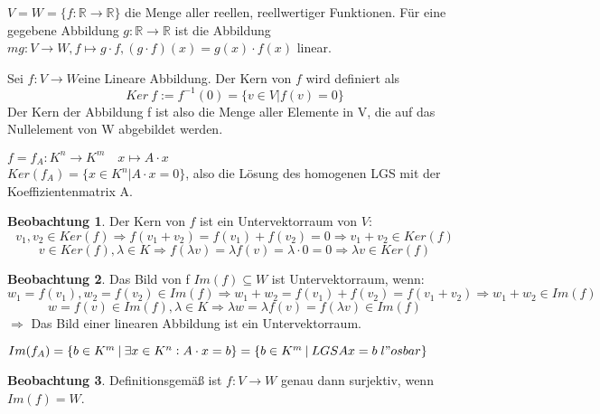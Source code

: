 \documentclass[oneside,fontsize=11pt,paper=a4,BCOR=0mm,DIV=12,automark,headsepline]{scrbook}
\theoremstyle{remark}
\theoremstyle{definition}
\newtheorem{beobachtung}{Beobachtung}
\theoremstyle{definition}
\theoremstyle{remark}
\begin{document}
\begin{exa}
  $V=W=\{f:\mathbb{R}\rightarrow\mathbb{R}\}$ die Menge aller reellen, reellwertiger Funktionen. Für eine gegebene Abbildung $g:\mathbb{R}\rightarrow\mathbb{R}$ ist die Abbildung $mg: V\rightarrow W, f\mapsto g\cdot f, (g\cdot f)(x)=g(x)\cdot f(x)$ linear.
\end{exa}

\begin{definition}{}{}
  Sei $f:V\rightarrow W$eine Lineare Abbildung. Der Kern von \(f\) wird definiert als \[Ker\: f := f^{-1}(0) = \{v\in V|f(v)=0\}\] Der Kern der Abbildung f ist also die Menge aller Elemente in V, die auf das Nullelement von W abgebildet werden.
\end{definition}

\begin{exa}
  $f=f_A: K^n\rightarrow K^m \quad x\mapsto A\cdot x$\\
  $Ker (f_A) = \{x\in K^n|A\cdot x = 0\}$, also die Lösung des homogenen LGS mit der Koeffizientenmatrix A.
\end{exa}

\begin{beobachtung}
  Der Kern von \(f\) ist ein Untervektorraum von \(V\):
  \[v_1 , v_2 \in Ker(f) \Rightarrow f(v_1 + v_2)=f(v_1 )+f(v_2 )=0 \Rightarrow v_1 + v_2 \in Ker(f) \]
  \[v \in Ker(f), \lambda \in K \Rightarrow f(\lambda v)=\lambda f(v)=\lambda \cdot 0 = 0 \Rightarrow \lambda v \in Ker(f) \]
\end{beobachtung}

\begin{beobachtung}
  Das Bild von f $Im(f) \subseteq W$ ist Untervektorraum, wenn:
  \[w_1 =f(v_1 ), w_2 = f(v_2 )\in Im(f) \Rightarrow w_1 +w_2 = f(v_1 )+f(v_2 )= f(v_1 +v_2) \Rightarrow w_1 +w_2 \in Im(f) \]
  \[w=f(v)\in Im(f), \lambda \in K \Rightarrow \lambda w = \lambda f(v)=f(\lambda v) \in Im(f) \]
  $\Rightarrow$ Das Bild einer linearen Abbildung ist ein Untervektorraum.
\end{beobachtung}

\begin{exa}
  $Im(f_A )=\{b\in K^m \:|\: \exists x \in K^n: A\cdot x=b \}=\{b\in K^m\:|\:LGS Ax=b\; l"osbar\} $
\end{exa}

\begin{beobachtung}
  Definitionsgemäß ist $f:V\rightarrow W$ genau dann surjektiv, wenn $Im(f) =
  W$.
\end{beobachtung}
\end{document}
